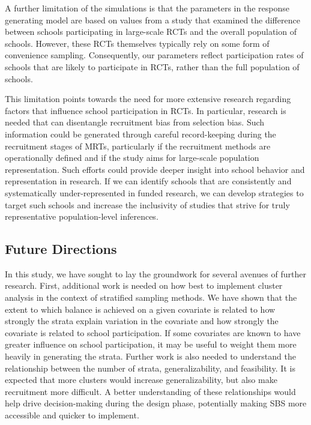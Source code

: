 \documentclass[english,man,floatsintext]{apa6}
\begin{document}
A further limitation of the simulations is that the parameters in the response generating model are based on values from a study that examined the difference between schools participating in large-scale RCTs and the overall population of schools. However, these RCTs themselves typically rely on some form of convenience sampling. Consequently, our parameters reflect participation rates of schools that are likely to participate in RCTs, rather than the full population of schools.

This limitation points towards the need for more extensive research regarding factors that influence school participation in RCTs. In particular, research is needed that can disentangle recruitment bias from selection bias. Such information could be generated through careful record-keeping during the recruitment stages of MRTs, particularly if the recruitment methods are operationally defined and if the study aims for large-scale population representation.
Such efforts could provide deeper insight into school behavior and representation in research. If we can identify schools that are consistently and systematically under-represented in funded research, we can develop strategies to target such schools and increase the inclusivity of studies that strive for truly representative population-level inferences.

\hypertarget{future-directions}{%
\subsection{Future Directions}\label{future-directions}}

In this study, we have sought to lay the groundwork for several avenues of further research. First, additional work is needed on how best to implement cluster analysis in the context of stratified sampling methods. We have shown that the extent to which balance is achieved on a given covariate is related to how strongly the strata explain variation in the covariate and how strongly the covariate is related to school participation. If some covariates are known to have greater influence on school participation, it may be useful to weight them more heavily in generating the strata. Further work is also needed to understand the relationship between the number of strata, generalizability, and feasibility. It is expected that more clusters would increase generalizability, but also make recruitment more difficult. A better understanding of these relationships would help drive decision-making during the design phase, potentially making SBS more accessible and quicker to implement.
\end{document}
